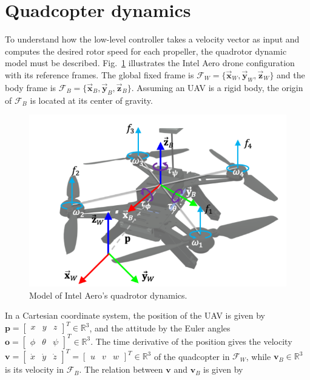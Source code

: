 \section{Quadcopter dynamics}

To understand how the low-level controller takes a velocity vector as input
and computes the desired rotor speed for each propeller, the quadrotor dynamic
model must be described.
Fig.~\ref{fig:aero-dynamics} illustrates the Intel Aero drone configuration
with its reference frames. The global fixed frame is $\mathcal{F}_W =
\{\vec{\mathbf{x}}_W, \vec{\mathbf{y}}_W, \vec{\mathbf{z}}_W\}$ and the body
frame is $\mathcal{F}_B = \{\vec{\mathbf{x}}_B, \vec{\mathbf{y}}_B,
\vec{\mathbf{z}}_B\}$. Assuming an UAV is a rigid body, the origin of
$\mathcal{F}_B$ is located at its center of gravity. 

\begin{figure}[h!]
  \centering
  \includegraphics[width=\textwidth]{figure/aero_dynamics.png}
  \caption{Model of Intel Aero's quadrotor dynamics.}
  \label{fig:aero-dynamics}
\end{figure}

In a Cartesian coordinate system, the position of the UAV is given by 
$\mathbf{p} = \begin{bmatrix} x & y & z \end{bmatrix}^T \in \mathbb{R}^3$,
and the attitude by the Euler angles
$\mathbf{o} = \begin{bmatrix} \phi & \theta & \psi\end{bmatrix}^T \in
\mathbb{R}^3$.
The time derivative of the position gives the velocity
$\mathbf{v} = \begin{bmatrix}\dot{x} & \dot{y} & \dot{z}\end{bmatrix}^T =
\begin{bmatrix} u & v & w \end{bmatrix}^T \in \mathbb{R}^3$
of the quadcopter in 
$\mathcal{F}_W$, while $\mathbf{v}_B \in \mathbb{R}^3$
is its velocity in $\mathcal{F}_B$. The relation between
$\mathbf{v}$ and $\mathbf{v}_B$ is given by

